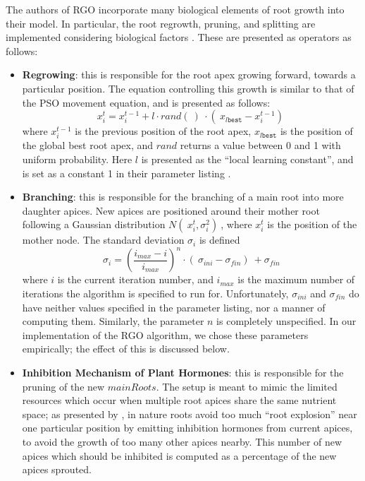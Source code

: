 \documentclass[letterpaper, 10 pt, conference]{ieeeconf}  %
\begin{document}
The authors of RGO incorporate many biological elements of root growth into their model.  In particular, the root regrowth, pruning, and splitting are implemented considering biological factors \cite{RGOPaper}.  These are presented as operators as follows:
\begin{itemize}
\item \textbf{Regrowing}: this is responsible for the root apex growing forward, towards a particular position.  The equation controlling this growth is similar to that of the PSO movement equation, and is presented as follows: $${ x_i^t = x_i^{t-1} + l \cdot rand(\ )\ \cdot (\ x_{l\texttt{best}} - x_i^{t-1} )\ }$$ where $x_i^{t-1}$ is the previous position of the root apex, $x_{l\texttt{best}}$ is the position of the global best root apex, and $rand$ returns a value between 0 and 1 with uniform probability.  Here $l$ is presented as the ``local learning constant'', and is set as a constant 1 in their parameter listing \cite{RGOPaper}.
\item \textbf{Branching}: this is responsible for the branching of a main root into more daughter apices.  New apices are positioned around their mother root following a Gaussian distribution $N (\ x_i^t, \sigma_i^2 )\ $, where $x_i^t$ is the position of the mother node.  The standard deviation $\sigma_i$ is defined $$ \sigma_i = \left( \frac{i_{max} - i}{i_{max}} \right)^n \cdot (\ \sigma_{ini} - \sigma_{fin} )\ + \sigma_{fin} $$ where $i$ is the current iteration number, and $i_{max}$ is the maximum number of iterations the algorithm is specified to run for.  Unfortunately, $\sigma_{ini}$ and $\sigma_{fin}$ do have neither values specified in the parameter listing, nor a manner of computing them.  Similarly, the parameter $n$ is completely unspecified.  In our implementation of the RGO algorithm, we chose these parameters empirically; the effect of this is discussed below.
\item \textbf{Inhibition Mechanism of Plant Hormones}: this is responsible for the pruning of the new $mainRoots$.  The setup is meant to mimic the limited resources which occur when multiple root apices share the same nutrient space; as presented by \cite{RGOPaper}, in nature roots avoid too much ``root explosion'' near one particular position by emitting inhibition hormones from current apices, to avoid the growth of too many other apices nearby.  This number of new apices which should be inhibited is computed as a percentage of the new apices sprouted.
\end{itemize}
\end{document}
